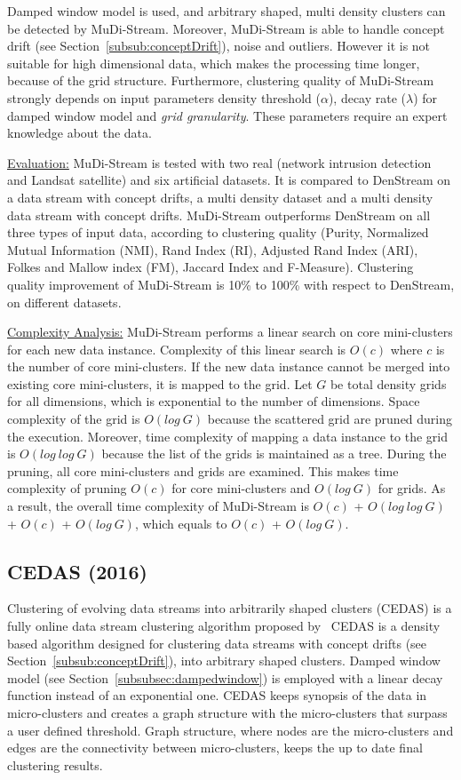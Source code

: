 \documentclass[smallcondensed]{svjour3}     %
\begin{document}
Damped window model is used, and arbitrary shaped, multi density clusters can be detected by MuDi-Stream. Moreover, MuDi-Stream is able to handle concept drift (see Section~\ref{subsub:conceptDrift}), noise and outliers. However it is not suitable for high dimensional data, which makes the processing time longer, because of the grid structure. Furthermore, clustering quality of MuDi-Stream strongly depends on input parameters density threshold ($\alpha$), decay rate ($\lambda$) for damped window model and \textit{grid granularity}. These parameters require an expert knowledge about the data.

\underline{Evaluation:} MuDi-Stream is tested with two real (network intrusion detection and Landsat satellite) and six artificial datasets. It is compared to DenStream on a data stream with concept drifts, a multi density dataset and a multi density data stream with concept drifts. MuDi-Stream outperforms DenStream on all three types of input data, according to clustering quality (Purity, Normalized Mutual Information (NMI), Rand Index (RI), Adjusted Rand Index (ARI), Folkes and Mallow index (FM), Jaccard Index and F-Measure). Clustering quality improvement of MuDi-Stream is 10\% to 100\% with respect to DenStream, on different datasets.

\underline{Complexity Analysis:} MuDi-Stream performs a linear search on core mini-clusters for each new data instance. Complexity of this linear search is $O(c)$ where $c$ is the number of core mini-clusters. If the new data instance cannot be merged into existing core mini-clusters, it is mapped to the grid. Let $G$ be total density grids for all dimensions, which is exponential to the number of dimensions. Space complexity of the grid is $O(log\ G)$ because the scattered grid are pruned during the execution. Moreover, time complexity of mapping a data instance to the grid is $O(log\ log\ G)$ because the list of the grids is maintained as a tree. During the pruning, all core mini-clusters and grids are examined. This makes time complexity of pruning $O(c)$ for core mini-clusters and $O(log\ G)$ for grids. As a result, the overall time complexity of MuDi-Stream is $O(c)$ + $O(log\ log\ G)$ + $O(c)$ + $O(log\ G)$, which equals to $O(c)$ + $O(log\ G)$.

\subsection{CEDAS (2016)}
Clustering of evolving data streams into arbitrarily shaped clusters (CEDAS) is a fully online data stream clustering algorithm proposed by~\citet{Hyde:2017:Cedas} CEDAS is a density based algorithm designed for clustering data streams with concept drifts (see Section~\ref{subsub:conceptDrift}), into arbitrary shaped clusters. Damped window model (see Section~\ref{subsubsec:dampedwindow}) is employed with a linear decay function instead of an exponential one. CEDAS keeps synopsis of the data in micro-clusters and creates a graph structure with the micro-clusters that surpass a user defined threshold. Graph structure, where nodes are the micro-clusters and edges are the connectivity between micro-clusters, keeps the up to date final clustering results.
\end{document}
